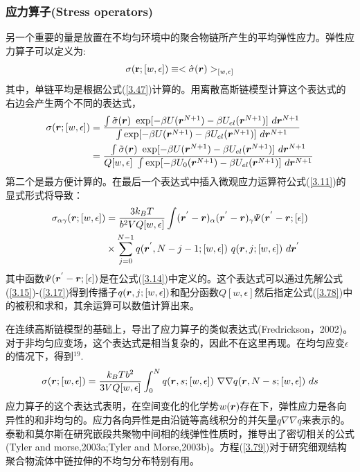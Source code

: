 \subsubsection{应力算子(Stress operators)}
另一个重要的量是放置在不均匀环境中的聚合物链所产生的平均弹性应力。弹性应力算子可以定义为:
\begin{equation}\label{3.76}
\sigma(\mathbf{\bm{r}};[w,\epsilon])\equiv<\hat{\sigma}(\bm{r})>_{[w,\epsilon]}
\end{equation}
其中，单链平均是根据公式(\ref{3.47})计算的。用离散高斯链模型计算这个表达式的右边会产生两个不同的表达式，
\begin{equation}\label{3.77}
\begin{aligned}
\sigma(\bm{r};[w,\epsilon])&=\frac{\int {\tilde{\sigma}}(\bm{r})~\exp[-\beta U(\bm{r}^{N+1})-\beta U_{el}(\bm{r}^{N+1})]~d\bm{r}^{N+1}}{\int \exp[-\beta U(\bm{r}^{N+1})-\beta U_{el}(\bm{r}^{N+1})]~d\bm{r}^{N+1}}\\&=\frac{\int \tilde{\sigma}(\bm{r})~\exp[-\beta U(\bm{r}^{N+1})-\beta U_{el}(\bm{r}^{N+1})]~d\bm{r}^{N+1}}{Q[w,\epsilon]~\int \exp[-\beta U_0(\bm{r}^{N+1})-\beta U_{el}(\bm{r}^{N+1})]~d\bm{r}^{N+1}}
\end{aligned}
\end{equation}
第二个是最方便计算的。在最后一个表达式中插入微观应力运算符公式(\ref{3.11})的显式形式将导致：
\begin{equation}
\begin{aligned}\label{3.78}
\sigma_{\alpha \gamma}(\bm{r};[w,\epsilon])&=\frac{3k_BT}{b^2VQ[w,\epsilon]} \int (\bm{r}^{'}-\bm{r})_{\alpha} (\bm{r}^{'}-\bm{r})_{\gamma} \varPsi (\bm{r}^{'}-\bm{r};[\epsilon])\\&\times \sum_{j=0}^{N-1}q(\bm{r}^{'},N-j-1;[w,\epsilon])~q(\bm{r},j;[w,\epsilon])~d\bm{r}^{'}
\end{aligned}
\end{equation}
其中函数$\varPsi (\bm{r}^{'}-\bm{r};[\epsilon])$是在公式(\ref{3.14})中定义的。这个表达式可以通过先解公式(\ref{3.15})-(\ref{3.17})得到传播子$q(\bm{r},j;[w,\epsilon])$和配分函数$Q[w,\epsilon]$然后指定公式(\ref{3.78})中的被积和求和，其余运算可以数值计算出来。

在连续高斯链模型的基础上，导出了应力算子的类似表达式(Fredrickson，2002)。对于非均匀应变场，这个表达式是相当复杂的，因此不在这里再现。在均匀应变$\epsilon$的情况下，得到$^{19}$.
\begin{equation}\label{3.79}
\sigma(\bm{r};[w,\epsilon])=\frac{k_BTb^2}{3VQ[w,\epsilon]}\int_{0}^{N} q(\bm{r},s;[w,\epsilon])~\nabla \nabla q(\bm{r},N-s;[w,\epsilon])~ds
\end{equation}
应力算子的这个表达式表明，在空间变化的化学势$w(\bm{r})$存在下，弹性应力是各向异性的和非均匀的。应力各向异性是由沿链等高线积分的并矢量$q\nabla \nabla q$来表示的。泰勒和莫尔斯在研究嵌段共聚物中间相的线弹性性质时，推导出了密切相关的公式(Tyler and morse,2003a;Tyler and Morse,2003b)。方程(\ref{3.79})对于研究细观结构聚合物流体中链拉伸的不均匀分布特别有用。

